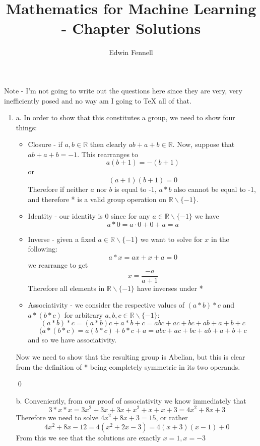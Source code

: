 \documentclass{article}
\title{Mathematics for Machine Learning - Chapter \chapternumber\space Solutions}
\author{Edwin Fennell}
\date{}
\newcommand{\chapternumber}{2}
\newenvironment{QandA}{\begin{enumerate}[label=\chapternumber.\arabic*]\bfseries\boldmath}
	{\end{enumerate}}
\newenvironment{answered}{\par\bigskip\normalfont\unboldmath}{}
\begin{document}
	\maketitle
	
	Note - I'm not going to write out the questions here since they are very, very inefficiently posed and no way am I going to TeX all of that.
	
	\noindent%
	\begin{QandA}
		\item
		\begin{answered}
			a. In order to show that this constitutes a group, we need to show four things:
			\begin{itemize}
				\item Closure - if $a,b\in\mathbb{R}$ then clearly $ab+a+b\in\mathbb{R}$.
				Now, suppose that $ab + a + b=-1$. This rearranges to
				\[a(b+1)=-(b+1)\]
				or 
				\[(a+1)(b+1)=0\]
				Therefore if neither $a$ nor $b$ is equal to -1, $a*b$ also cannot be equal to -1, and therefore * is a valid group operation on $\mathbb{R}\backslash\{-1\}$.
				\item Identity - our identity is 0 since for any $a\in\mathbb{R}\backslash\{-1\}$ we have
				\[a*0 = a\cdot0 + 0 + a = a\]
				\item Inverse - given a fixed $a\in\mathbb{R}\backslash\{-1\}$ we want to solve for $x$ in the following:
				\[a*x = ax + x + a = 0\]
				we rearrange to get
				\[x = \frac{-a}{a+1}\]
				Therefore all elements in $\mathbb{R}\backslash\{-1\}$ have inverses under *
				\item Associativity - we consider the respective values of $(a*b)*c$ and $a*(b*c)$ for arbitrary $a,b,c\in\mathbb{R}\backslash\{-1\}$:
				\[(a*b)*c = (a*b)c + a*b + c = abc + ac + bc + ab + a + b + c\]
				\[(a*(b*c) = a(b*c) + b*c + a = abc + ac + bc + ab + a + b + c\]
				and so we have associativity.
						
			\end{itemize}
				
				Now we need to show that the resulting group is Abelian, but this is clear from the definition of * being completely symmetric in its two operands.
				
				\qed
				
				b. Conveniently, from our proof of associativity we know immediately that
				\[3*x*x = 3x^2 + 3x + 3x + x^2 + x + x + 3 = 4x^2 + 8x + 3\]
				Therefore we need to solve $4x^2 + 8x + 3 = 15$, or rather
				\[4x^2 + 8x - 12 = 4(x^2 + 2x -3) = 4(x+3)(x-1)+0\]
				From this we see that the solutions are exactly $x=1,x=-3$
		\end{answered}
		

\end{QandA}
\end{document}
